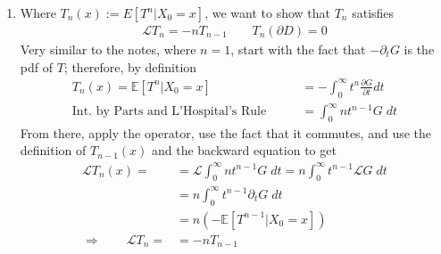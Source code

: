 \documentclass[12pt]{article}
\theoremstyle{plain}
\theoremstyle{definition}
\theoremstyle{remark}
\begin{document}
\begin{enumerate}
  \item %
    Where $T_n(x):=E[T^n|X_0=x]$, we want to show that $T_n$ satisfies
    \begin{align*}
      \mathscr{L}T_n = -n T_{n-1} \qquad T_n(\partial D)=0
    \end{align*}
    Very similar to the notes, where $n=1$, start with the fact that
    $-\partial_t G$ is the pdf of $T$; therefore, by definition
    \begin{align*}
      T_n(x)=\mathbb{E}[T^n|X_0=x]
      &= -\int^\infty_0 t^n \frac{\partial G}{\partial t} dt\\
      \text{Int.\ by Parts and L'Hospital's Rule} \qquad
      &= \int^\infty_0 n t^{n-1} G \; dt
    \end{align*}
    From there, apply the operator, use the fact that it commutes, and
    use the definition of $T_{n-1}(x)$ and the backward equation to get
    \begin{align*}
      \mathscr{L}T_n(x)=
      &= \mathscr{L}\int^\infty_0 n t^{n-1} G \; dt
      = n\int^\infty_0  t^{n-1} \mathscr{L}G \; dt\\
      &= n\int^\infty_0  t^{n-1} \partial_tG \; dt\\
      &= n(-\mathbb{E}[T^{n-1}|X_0=x])\\
      \Rightarrow\qquad
      \mathscr{L}T_n=
      &= -nT_{n-1}
    \end{align*}


\end{enumerate}
\end{document}

